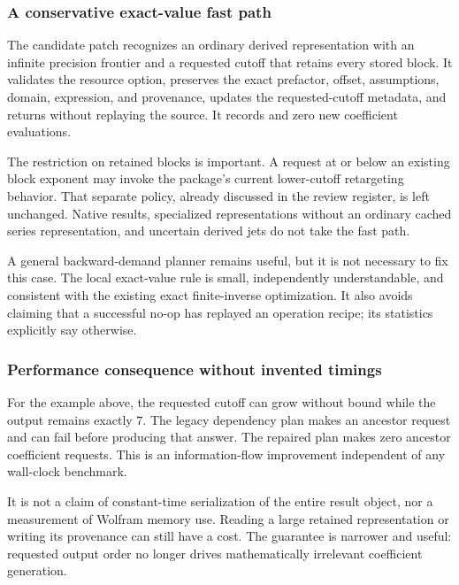 \documentclass[11pt,letterpaper]{article}
\newcommand{\code}[1]{\texttt{\detokenize{#1}}}
\begin{document}
\subsubsection*{A conservative exact-value fast path}

The candidate patch recognizes an ordinary derived representation with an infinite precision frontier and a requested cutoff that retains every stored block. It validates the resource option, preserves the exact prefactor, offset, assumptions, domain, expression, and provenance, updates the requested-cutoff metadata, and returns without replaying the source. It records \code{"Strategy" -> "ExactValueNoOp"} and zero new coefficient evaluations.

The restriction on retained blocks is important. A request at or below an existing block exponent may invoke the package's current lower-cutoff retargeting behavior. That separate policy, already discussed in the review register, is left unchanged. Native results, specialized representations without an ordinary cached series representation, and uncertain derived jets do not take the fast path.

A general backward-demand planner remains useful, but it is not necessary to fix this case. The local exact-value rule is small, independently understandable, and consistent with the existing exact finite-inverse optimization. It also avoids claiming that a successful no-op has replayed an operation recipe; its statistics explicitly say otherwise.

\subsubsection*{Performance consequence without invented timings}

For the example above, the requested cutoff can grow without bound while the output remains exactly $7$. The legacy dependency plan makes an ancestor request and can fail before producing that answer. The repaired plan makes zero ancestor coefficient requests. This is an information-flow improvement independent of any wall-clock benchmark.

It is not a claim of constant-time serialization of the entire result object, nor a measurement of Wolfram memory use. Reading a large retained representation or writing its provenance can still have a cost. The guarantee is narrower and useful: requested output order no longer drives mathematically irrelevant coefficient generation.
\end{document}
